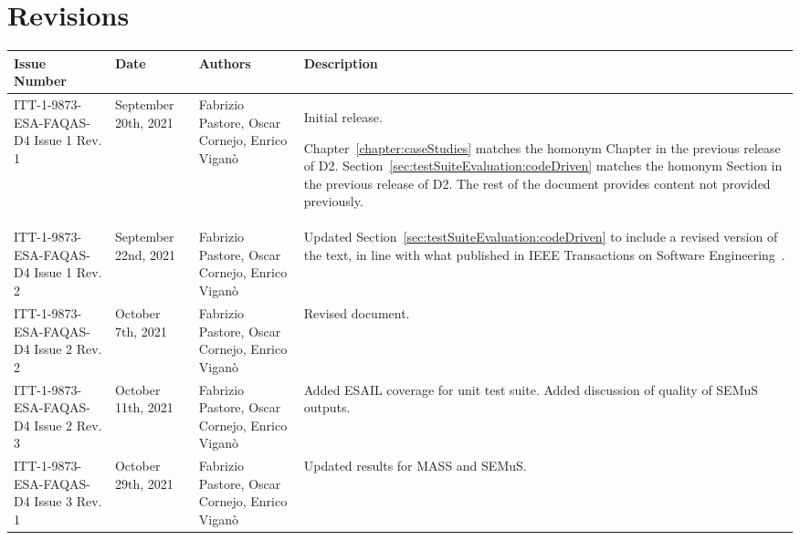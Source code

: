 
\section*{Revisions}
\label{sec:revisions}


\setlength\LTleft{0pt}
\setlength\LTright{0pt}
\tiny 
\begin{longtable}{|p{2cm}|p{1cm}|p{1.5cm}|p{9cm}|@{}}
\label{table:codeoperators} \\
\hline
\textbf{Issue Number}&\textbf{Date}&\textbf{Authors}&\textbf{Description}\\
\hline
ITT-1-9873-ESA-FAQAS-D4
Issue 1 Rev. 1&
September 20th, 2021&
Fabrizio Pastore, Oscar Cornejo, Enrico Viganò&
\begin{minipage}{8cm}
Initial release.

Chapter~\ref{chapter:caseStudies} matches the homonym Chapter in the previous release of D2.
Section~\ref{sec:testSuiteEvaluation:codeDriven} matches the homonym Section in the previous release of D2.
The rest of the document provides content not provided previously.
\end{minipage}
\\
\hline
ITT-1-9873-ESA-FAQAS-D4
Issue 1 Rev. 2&
September 22nd, 2021&
Fabrizio Pastore, Oscar Cornejo, Enrico Viganò&
\begin{minipage}{8cm}
Updated Section~\ref{sec:testSuiteEvaluation:codeDriven} to include a revised version of the text, in line with what published in IEEE Transactions on Software Engineering~\cite{Oscar:TSE}.
\end{minipage}
\\
\hline
ITT-1-9873-ESA-FAQAS-D4
Issue 2 Rev. 2&
October 7th, 2021&
Fabrizio Pastore, Oscar Cornejo, Enrico Viganò&
\begin{minipage}{8cm}
Revised document.
\end{minipage}
\\
\hline

ITT-1-9873-ESA-FAQAS-D4
Issue 2 Rev. 3&
October 11th, 2021&
Fabrizio Pastore, Oscar Cornejo, Enrico Viganò&
\begin{minipage}{8cm}
Added ESAIL coverage for unit test suite. Added discussion of quality of SEMuS outputs.
\end{minipage}
\\
\hline

ITT-1-9873-ESA-FAQAS-D4
Issue 3 Rev. 1&
October 29th, 2021&
Fabrizio Pastore, Oscar Cornejo, Enrico Viganò&
\begin{minipage}{8cm}
Updated results for MASS and SEMuS.
\end{minipage}
\\
\hline
                                                    
\end{longtable}
\normalsize

\clearpage